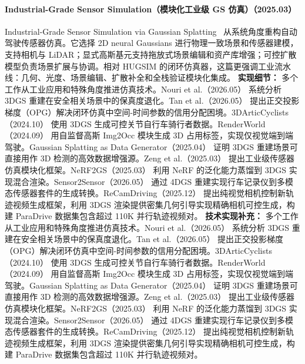 \paragraph{Industrial-Grade Sensor Simulation（模块化工业级 GS 仿真）（2025.03）}
Industrial-Grade Sensor Simulation via Gaussian Splatting~\cite{2503_11731} 从系统角度重构自动驾驶传感器仿真。它选择 2D neural Gaussians 进行物理一致场景和传感器建模，支持相机与 LiDAR；显式高斯基元支持拖放式场景编辑和资产库增强；可控扩散模型负责场景扩展与协调。相对 HUGSIM 的闭环仿真器，这篇更强调工业流水线：几何、光度、场景编辑、扩散补全和全栈验证模块化集成。
\textbf{实现细节：} 多个工作从工业应用和特殊角度推进仿真技术。Nouri et al.（2026.05） 系统分析 3DGS 重建在安全相关场景中的保真度退化。Tan et al.（2026.05） 提出正交投影梯度（OPG）解决闭环仿真中空间-时间参数的信用分配困境。3DArticCyclists（2024.10） 使用 3DGS 生成可控关节自行车骑行者数据。RenderWorld（2024.09） 用自监督高斯 Img2Occ 模块生成 3D 占用标签，实现仅视觉端到端驾驶。Gaussian Splatting as Data Generator（2025.04） 证明 3DGS 重建场景可直接用作 3D 检测的高效数据增强源。Zeng et al.（2025.03） 提出工业级传感器仿真模块化框架。NeRF2GS（2025.03） 利用 NeRF 的泛化能力蒸馏到 3DGS 实现混合渲染。Sensor2Sensor（2026.05） 通过 4DGS 重建实现行车记录仪到多模态传感器套件的生成转换。ReCamDriving（2025.12） 提出纯视觉相机控制新轨迹视频生成框架，利用 3DGS 渲染提供密集几何引导实现精确相机可控生成，构建 ParaDrive 数据集包含超过 110K 并行轨迹视频对。
\textbf{技术实现补充：} 多个工作从工业应用和特殊角度推进仿真技术。Nouri et al.（2026.05） 系统分析 3DGS 重建在安全相关场景中的保真度退化。Tan et al.（2026.05） 提出正交投影梯度（OPG）解决闭环仿真中空间-时间参数的信用分配困境。3DArticCyclists（2024.10） 使用 3DGS 生成可控关节自行车骑行者数据。RenderWorld（2024.09） 用自监督高斯 Img2Occ 模块生成 3D 占用标签，实现仅视觉端到端驾驶。Gaussian Splatting as Data Generator（2025.04） 证明 3DGS 重建场景可直接用作 3D 检测的高效数据增强源。Zeng et al.（2025.03） 提出工业级传感器仿真模块化框架。NeRF2GS（2025.03） 利用 NeRF 的泛化能力蒸馏到 3DGS 实现混合渲染。Sensor2Sensor（2026.05） 通过 4DGS 重建实现行车记录仪到多模态传感器套件的生成转换。ReCamDriving（2025.12） 提出纯视觉相机控制新轨迹视频生成框架，利用 3DGS 渲染提供密集几何引导实现精确相机可控生成，构建 ParaDrive 数据集包含超过 110K 并行轨迹视频对。 %

